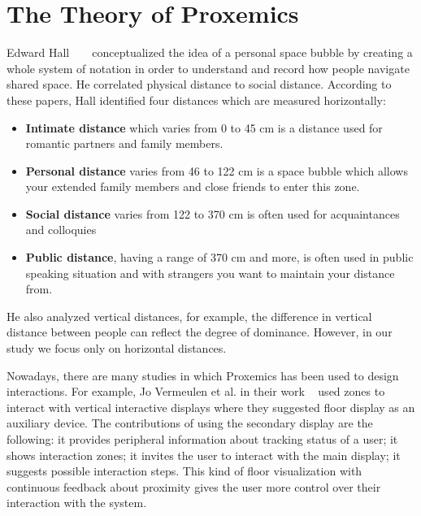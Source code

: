 \section{The Theory of Proxemics}
\label{sec:The Theory of Proxemics}
Edward Hall ~\cite{hall1963system} ~\cite{hall1910hidden} conceptualized the idea of a
personal space bubble by creating a whole system of notation in order to understand
and record how people navigate shared space.
He correlated physical distance to social distance.
According to these papers, Hall identified four distances which are measured horizontally:
\begin{itemize}
  \item \textbf{Intimate distance} which varies from 0 to 45 cm is a distance used for romantic partners and family members.
  \item \textbf{Personal distance} varies from 46 to 122 cm is a space bubble which allows your extended family members and close friends to enter this zone.
  \item \textbf{Social distance} varies from 122 to 370 cm is often used for acquaintances and colloquies
  \item \textbf{Public distance}, having a range of 370 cm and more, is often used in public speaking situation and with strangers you want to maintain your distance from.
\end{itemize}

He also analyzed vertical distances, for example, the difference in vertical distance
between people can reflect the degree of dominance.
However, in our study we focus only on horizontal distances.

\par Nowadays, there are many studies in which Proxemics has been used to design interactions.
For example, Jo Vermeulen et al. in their work ~\cite{vermeulen2015proxemic} used zones to
interact with vertical interactive displays where they suggested floor display as an auxiliary device.
The contributions of using the secondary display are the following: it provides peripheral
information about tracking status of a user; it shows interaction zones;
it invites the user to interact with the main display; it suggests possible interaction steps.
This kind of floor visualization with continuous feedback about proximity gives the user
more control over their interaction with the system.

